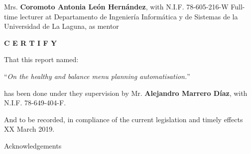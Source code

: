 \documentclass[english,a4paper,14pt,oneside]{extreport}
\begin{document}
\bigskip
Mrs. {\bf Coromoto Antonia León Hernández}, with N.I.F. 78-605-216-W
Full-time lecturer at Departamento 
de Ingeniería Informática y de Sistemas
de la Universidad de La Laguna, as mentor

\bigskip
\bigskip
{\bf C E R T I F Y}

\bigskip
\bigskip
\bigskip
That this report named:

\bigskip
``{\it On the healthy and balance menu planning automatisation.}''

\bigskip
\bigskip
\bigskip

\noindent has been done under they supervision by Mr. {\bf Alejandro Marrero Díaz},
with N.I.F. 78-649-404-F.

\bigskip
\bigskip

And to be recorded, in compliance of the current legislation and timely effects XX March 2019.

\newpage
\thispagestyle{empty}

{ \flushright

\begin{LARGE}
Acknowledgements 
\end{LARGE}

\hspace{3mm}

\begin{large}


\hspace{3mm}

\hspace{3mm}

\bigskip

\hspace{3mm}

\hspace{3mm}

\hspace{3mm}

\hspace{3mm}

\end{large}

}

\newpage
\end{document}

